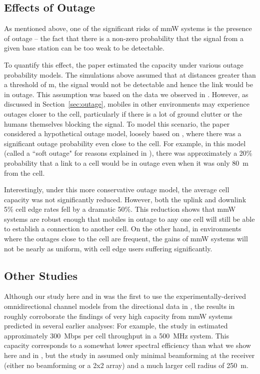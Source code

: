 \documentclass[journal]{IEEEtran}
\begin{document}
\subsection{Effects of Outage}

As mentioned above, one of the significant risks of mmW systems
is the presence of outage -- the fact that there is a non-zero probability
that the signal from a given base station can be too weak to be detectable.

To quantify this effect, the paper \cite{AkLiuRanRapEr:13-arxiv}
estimated the capacity under various outage probability models.
The simulations above assumed that at distances greater than a threshold of
m, the signal would not be detectable and hence the link
would be in outage.  This assumption was based on the data we observed in
\cite{rappaportmillimeter,ben2011millimeter,Rappaport:12-28G,Rappaport:28NYCPenetrationLoss,Samimi:AoAD,Nie72G-PIMRC:13,Rappaport:13-BBmmW}.
However, as discussed in Section~\ref{sec:outage}, mobiles in
other environments may experience outages closer to the cell,
particularly if there is a lot of ground clutter or the humans themselves
blocking the signal.
To model this scenario, the paper \cite{AkLiuRanRapEr:13-arxiv}
considered a hypothetical outage model, loosely based on
 \cite{3GPP36.814},
 where there was a significant outage probability even close to the cell.
For example, in this model (called a ``soft outage" for reasons explained in
\cite{AkLiuRanRapEr:13-arxiv}), there was approximately a 20\% probability
that a link to a cell would be in outage even when it was only 80~m from the cell.

Interestingly, under this more conservative outage model, the average cell
capacity was not significantly reduced.  However, both the uplink and downlink
5\% cell edge rates fell by a dramatic 50\%.  This reduction shows that mmW systems are robust enough
that mobiles in outage to any one cell will still be able
to establish a connection to another cell.  On the other hand, in environments
where the outages close to the cell are frequent, the gains of mmW systems
will not be nearly as uniform, with cell edge users suffering significantly.

\subsection{Other Studies}
Although our study here and in \cite{AkLiuRanRapEr:13-arxiv}
was the first to use
the experimentally-derived omnidirectional channel models from the
directional data in
\cite{rappaportmillimeter}, the results in
\cite{AkLiuRanRapEr:13-arxiv} roughly
corroborate the findings of very high capacity from mmW systems
predicted in several earlier analyses:
For example, the study in \cite{KhanPi:11} estimated approximately 300~Mbps per cell throughput
in a 500~MHz system.  This capacity corresponds to
a somewhat lower spectral efficiency than what we show here and in
\cite{AkLiuRanRapEr:13-arxiv},
but  the study in \cite{KhanPi:11} assumed only minimal beamforming at the receiver
(either no beamforming or a 2x2 array) and a much larger cell radius of 250~m.
\end{document}
